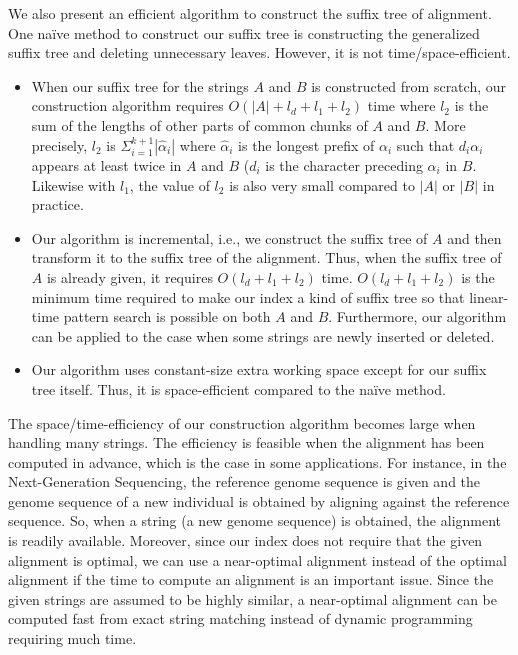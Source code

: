 \documentclass{llncs}
\newcommand{\partitle}[1]{}                        \newcommand{\commentout}[1]{}
\newcommand{\bi}{\begin{itemize}}
\newcommand{\ei}{\end{itemize}}
\begin{document}
\partitle{contribution 2}

We also present an efficient algorithm to construct the suffix tree of alignment.
One na\"{i}ve method to construct our suffix tree is constructing the generalized suffix tree
 and deleting unnecessary leaves.
However, it is not time/space-efficient.
\bi
\item When our suffix tree for the strings $A$ and $B$ is constructed from scratch,
  our construction algorithm requires $O(|A| + l_d + l_1 + l_2)$ time
  where $l_2$ is the sum of the lengths of other parts of common chunks of $A$ and $B$.
 More precisely, $l_2$ is $\Sigma_{i=1}^{k+1} |\hat{\alpha}_i|$
  where $\hat{\alpha}_i$ is the longest prefix of $\alpha_i$
  such that $d_i \alpha_i$ appears at least twice in $A$ and $B$
  ($d_i$ is the character preceding $\alpha_i$ in $B$.
Likewise with $l_1$,
 the value of $l_2$ is also very small compared to $|A|$ or $|B|$ in practice.
\item Our algorithm is incremental,
    i.e., we construct the suffix tree of $A$
     and then transform it to the suffix tree of the alignment.
    Thus, when the suffix tree of $A$ is already given,
     it requires $O(l_d + l_1 + l_2)$ time.
    $O(l_d + l_1 + l_2)$ is the minimum time required to make our index a kind of suffix tree
     so that linear-time pattern search is possible on both $A$ and $B$.
    Furthermore, our algorithm can be applied to the case when some strings are newly inserted
     or deleted.
\item Our algorithm uses constant-size extra working space except for our suffix tree itself.
 Thus, it is space-efficient compared to the na\"{i}ve method.
\ei
The space/time-efficiency of our construction algorithm becomes large
 when handling many strings.
The efficiency is feasible when the alignment has been computed in advance,
 which is the case in some applications.
For instance, in the Next-Generation Sequencing,
 the reference genome sequence is given
 and the genome sequence of a new individual is obtained
 by aligning against the reference sequence.
So, when a string (a new genome sequence) is obtained,
 the alignment is readily available.
Moreover, since our index does not require that the given alignment is optimal,
 we can use a near-optimal alignment instead of the optimal alignment
 if the time to compute an alignment is an important issue.
Since the given strings are assumed to be highly similar,
 a near-optimal alignment can be computed fast from exact string matching
 instead of dynamic programming requiring much time.
\end{document}

